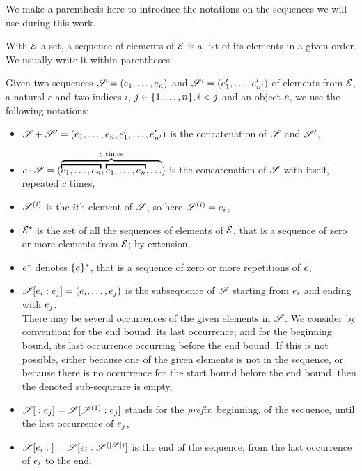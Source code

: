 We make a parenthesis here to introduce the notations on the sequences we will use during this work.

With $\mathcal{E}$ a set, a sequence of elements of $\mathcal{E}$ is a list of its elements in a given order.
We usually write it within parentheses.

Given two sequences $\defSeq{1}{n}$ and $\defSeq[\seq'][\sit']{1}{n'}$ of elements from $\mathcal{E}$, a natural $c$ and two indices $i$, $j \in \{1, \dots, n\}, i < j$ and an object $e$, we use the following notations:
\begin{itemize}
  \item $\seq \concat \seq' = (\elemsSeq{1}{n}, \elemsSeq[\sit']{1}{n'})$ is the concatenation of $\seq$ and $\seq'$,
  \item $c \cdot \seq = (\overbrace{\overbracket{\elemsSeq{1}{n}}, \overbracket{\elemsSeq{1}{n}}, {\dots}}^{c \text{ times}})$ is the concatenation of $\seq$ with itself, repeated $c$ times,
  \item $\seq[i]$ is the $i$th element of $\seq$, so here $\seq[i] = \sit_i$, 
  \item $\mathcal{E}^*$ is the set of all the sequences of elements of $\mathcal{E}$, that is a sequence of zero or more elements from $\mathcal{E}$; by extension,
  \item $e^*$ denotes $\{e\}^*$, that is a sequence of zero or more repetitions of $e$,
  \item $\slice{\sit_i}{\sit_j} = \bodySeq{i}{j}$ is the subsequence of $\seq$ starting from $e_i$ and ending with $e_j$.\\
    There may be several occurrences of the given elements in $\seq$.
    We consider by convention: for the end bound, its last occurrence; and for the beginning bound, its last occurrence occurring before the end bound.
    If this is not possible, either because one of the given elements is not in the sequence, or because there is no occurrence for the start bound before the end bound, then the denoted sub-sequence is empty,
  \item $\slice{}{\sit_j} = \slice{\seq[1]}{\sit_j}$ stands for the \emph{prefix},  beginning, of the sequence, until the last occurrence of $e_j$,
  \item $\slice{\sit_i}{} = \slice{\sit_i}{\seq[\card{\seq}]}$ is the end of the sequence, from the last occurrence of $e_i$ to the end.
\end{itemize}

